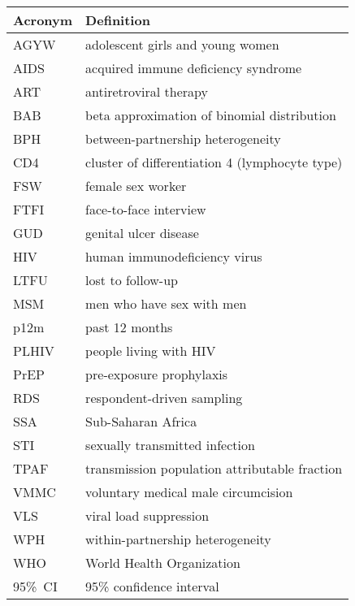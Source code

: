 \begin{tabular}{ll}
  \toprule
  Acronym & Definition \\
  \midrule
  AGYW    & adolescent girls and young women \\
  AIDS    & acquired immune deficiency syndrome \\
  ART     & antiretroviral therapy \\
  BAB     & beta approximation of binomial distribution \\
  BPH     & between-partnership heterogeneity \\
  CD4     & cluster of differentiation 4 (lymphocyte type) \\
  FSW     & female sex worker \\
  FTFI    & face-to-face interview \\
  GUD     & genital ulcer disease \\
  HIV     & human immunodeficiency virus \\
  LTFU    & lost to follow-up \\
  MSM     & men who have sex with men \\
  p12m    & past 12 months \\
  PLHIV   & people living with HIV \\
  PrEP    & pre-exposure prophylaxis \\
  RDS     & respondent-driven sampling \\
  SSA     & Sub-Saharan Africa \\
  STI     & sexually transmitted infection \\
  TPAF    & transmission population attributable fraction \\
  VMMC    & voluntary medical male circumcision \\
  VLS     & viral load suppression \\
  WPH     & within-partnership heterogeneity \\
  WHO     & World Health Organization \\
  95\%~CI & 95\% confidence interval \\
  \bottomrule
\end{tabular}